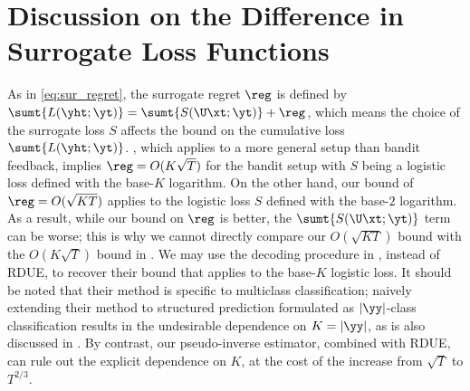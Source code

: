 \section{Discussion on the Difference in Surrogate Loss Functions}\label{app:Discussio_on_the_Difference_in_Surrogate_Losses}

As in \eqref{eq:sur_regret}, the surrogate regret $\reg$ is defined by $\sumt{L(\yht;\yt)}=\sumt{S(\U\xt;\yt)}+\reg$, which means the choice of the surrogate loss $S$ affects the bound on the cumulative loss $\sumt{L(\yht;\yt)}$.
, which applies to a more general setup than bandit feedback, implies $\reg = O(K\sqrt{T})$ for the bandit setup with $S$ being a logistic loss defined with the base-$K$ logarithm. 
On the other hand, our bound of $\reg = O(\sqrt{KT})$ applies to the logistic loss $S$ defined with the base-$2$ logarithm. 
As a result, while our bound on $\reg$ is better, the $\sumt{S(\U\xt;\yt)}$ term can be worse; this is why we cannot directly compare our $O(\sqrt{KT})$ bound with the $O(K\sqrt{T})$ bound in . 
We may use the decoding procedure in \citet{NEURIPS2021_Hoeven}, instead of RDUE, to recover their bound that applies to the base-$K$ logistic loss.
It should be noted that their method is specific to multiclass classification;  
naively extending their method to structured prediction formulated as $|\yy|$-class classification results in the undesirable dependence on $K = |\yy|$, as is also discussed in \citet{pmlr-v247-sakaue24a}. 
By contrast, our pseudo-inverse estimator, combined with RDUE, can rule out the explicit dependence on $K$, at the cost of the increase from $\sqrt{T}$ to $T^{2/3}$.